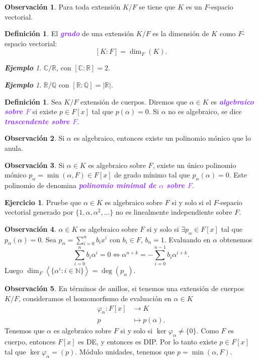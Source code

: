 \documentclass{article}
\theoremstyle{definition}
\newtheorem{definition}[theorem]{Definición}
\newtheorem{exercise}{Ejercicio}
\newtheorem*{obs}{Observación}
\theoremstyle{remark}
\newtheorem{example}[theorem]{\textbf{Ejemplo}}
\numberwithin{equation}{section}
\newcommand{\C}{\mathbb{C}}
\newcommand{\N}{\mathbb{N}}
\newcommand{\Q}{\mathbb{Q}}
\newcommand{\R}{\mathbb{R}}
\renewcommand{\a}{\alpha}
\newcommand{\vphi}{\varphi}
\newcommand{\abs}[1]{\left| #1 \right|}
\newcommand{\gen}[1]{\left\langle #1 \right\rangle}
\newcommand{\ds}{\displaystyle}
\newcommand{\wea}[1]{\textcolor{BlueViolet}{\textbf{\emph{#1}}}}
\begin{document}
\begin{obs}
  Para toda extensión $K/F$ se tiene que $K$ es un $F$-espacio vectorial.
\end{obs}

\begin{definition}
  El \wea{grado} de una extensión $K/F$ es la dimensión de $K$ como $F$-espacio vectorial:
  \[ [K : F] = \dim_F(K). \]
\end{definition}

\begin{example}
  $\C/\R$, con $[\C : \R] = 2$.
\end{example}

\begin{example}
  $\R/\Q$ con $[\R : \Q] = \abs\R$.
\end{example}

\begin{definition}
  Sea $K/F$ extensión de cuerpos. Diremos que $\a \in K$ es \wea{algebraico sobre $F$} si existe $p \in F[x]$ tal que $p(\a) = 0$.
  Si $\a$ no es algebraico, se dice \wea{trascendente sobre $F$}.
\end{definition}

\begin{obs}
  Si $\a$ es algebraico, entonces existe un polinomio mónico que lo anula.
\end{obs}

\begin{obs}
  Si $\a \in K$ es algebraico sobre $F$, existe un único polinomio mónico $p_\a = \min(\a,F) \in F[x]$ de grado mínimo tal que $p_\a(\a) = 0$. Este polinomio de denomina \wea{polinomio minimal de $\a$ sobre $F$}.
\end{obs}

\begin{exercise}
  Pruebe que $\a \in K$ es algebraico sobre $F$ si y solo si el $F$-espacio vectorial generado por $\{1,\a,\a^2, \dots\}$ no es linealmente independiente sobre $F$.
\end{exercise}

\begin{obs}
  $\a \in K$ es algebraico sobre $F$ si y solo si $\exists p_\a \in F[x]$ tal que $p_\a(\a) = 0$.
  Sea $\ds p_\a = \sum_{i=0}^n b_i x^i$ con $b_i \in F$, $b_n = 1$. Evaluando en $\a$ obtenemos
  \[ \sum_{i=0}^n b_i \a^i = 0 \iff \a^{n+k} = - \sum_{i=0}^{n-1} b_i \a^{i+k}. \]
  Luego $\dim_F \gen{\{\a^i : i \in \N\}} = \deg(p_\a)$.
\end{obs}

\begin{obs}
  En términos de anillos, si tenemos una extensión de cuerpos $K/F$, consideramos el homomorfismo de evaluación en $\a \in K$
  \begin{align*}
      \varphi_\a \colon F[x] &\to K \\
      p &\mapsto p(\a).
  \end{align*}
  Tenemos que $\a$ es algebraico sobre $F$ si y solo si $\ker\varphi_\a \neq \{0\}$. Como $F$ es cuerpo, entonces $F[x]$ es DE, y entonces es DIP. Por lo tanto existe $p \in F[x]$ tal que $\ker\vphi_\a = (p)$. Módulo unidades, tenemos que $p = \min(\a,F)$.
\end{obs}
\end{document}
